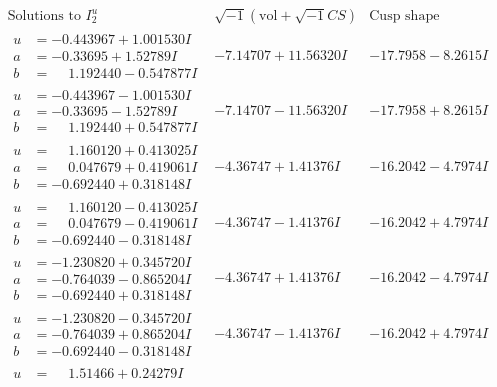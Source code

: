 \documentclass[1p]{elsarticle_modified}
\theoremstyle{definition}
\newcommand{\I}{\sqrt{-1}}
\begin{document}
$$\begin{array}{c|c|c}  
\text{Solutions to }I^u_{2}& \I (\text{vol} + \sqrt{-1}CS) & \text{Cusp shape}\\
 \hline 
\begin{aligned}
u &= -0.443967 + 1.001530 I \\
a &= -0.33695 + 1.52789 I \\
b &= \phantom{-}1.192440 - 0.547877 I\end{aligned}
 & -7.14707 + 11.56320 I & -17.7958 - 8.2615 I \\ \hline\begin{aligned}
u &= -0.443967 - 1.001530 I \\
a &= -0.33695 - 1.52789 I \\
b &= \phantom{-}1.192440 + 0.547877 I\end{aligned}
 & -7.14707 - 11.56320 I & -17.7958 + 8.2615 I \\ \hline\begin{aligned}
u &= \phantom{-}1.160120 + 0.413025 I \\
a &= \phantom{-}0.047679 + 0.419061 I \\
b &= -0.692440 + 0.318148 I\end{aligned}
 & -4.36747 + 1.41376 I & -16.2042 - 4.7974 I \\ \hline\begin{aligned}
u &= \phantom{-}1.160120 - 0.413025 I \\
a &= \phantom{-}0.047679 - 0.419061 I \\
b &= -0.692440 - 0.318148 I\end{aligned}
 & -4.36747 - 1.41376 I & -16.2042 + 4.7974 I \\ \hline\begin{aligned}
u &= -1.230820 + 0.345720 I \\
a &= -0.764039 - 0.865204 I \\
b &= -0.692440 + 0.318148 I\end{aligned}
 & -4.36747 + 1.41376 I & -16.2042 - 4.7974 I \\ \hline\begin{aligned}
u &= -1.230820 - 0.345720 I \\
a &= -0.764039 + 0.865204 I \\
b &= -0.692440 - 0.318148 I\end{aligned}
 & -4.36747 - 1.41376 I & -16.2042 + 4.7974 I \\ \hline\begin{aligned}
u &= \phantom{-}1.51466 + 0.24279 I \\

\end{aligned}
\end{array}$$
\end{document}
